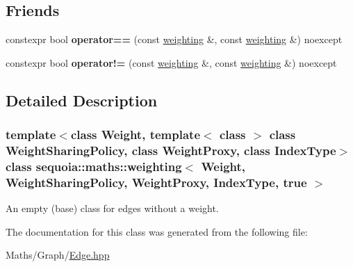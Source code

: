 \subsection*{Friends}
\begin{DoxyCompactItemize}
\item 
\mbox{\label{classsequoia_1_1maths_1_1weighting_3_01_weight_00_01_weight_sharing_policy_00_01_weight_proxy_00_01_index_type_00_01true_01_4_a612d637ad1deccfde492caafd8734129}} 
constexpr bool {\bfseries operator==} (const \mbox{\hyperlink{classsequoia_1_1maths_1_1weighting}{weighting}} \&, const \mbox{\hyperlink{classsequoia_1_1maths_1_1weighting}{weighting}} \&) noexcept
\item 
\mbox{\label{classsequoia_1_1maths_1_1weighting_3_01_weight_00_01_weight_sharing_policy_00_01_weight_proxy_00_01_index_type_00_01true_01_4_abf53bc32eebf4baaa3bd7b8835f1bbc4}} 
constexpr bool {\bfseries operator!=} (const \mbox{\hyperlink{classsequoia_1_1maths_1_1weighting}{weighting}} \&, const \mbox{\hyperlink{classsequoia_1_1maths_1_1weighting}{weighting}} \&) noexcept
\end{DoxyCompactItemize}


\subsection{Detailed Description}
\subsubsection*{template$<$class Weight, template$<$ class $>$ class Weight\+Sharing\+Policy, class Weight\+Proxy, class Index\+Type$>$\newline
class sequoia\+::maths\+::weighting$<$ Weight, Weight\+Sharing\+Policy, Weight\+Proxy, Index\+Type, true $>$}

An empty (base) class for edges without a weight. 

The documentation for this class was generated from the following file\+:\begin{DoxyCompactItemize}
\item 
Maths/\+Graph/\mbox{\hyperlink{_edge_8hpp}{Edge.\+hpp}}\end{DoxyCompactItemize}
